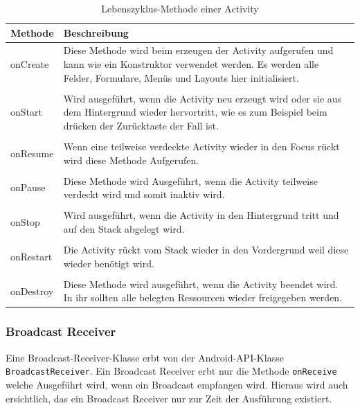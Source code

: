 \begin{table}[!ht]
\begin{tabular}{|p{3cm}|p{12cm}|}
 \hline Methode & Beschreibung \\
 \hline onCreate & Diese Methode wird beim erzeugen der Activity aufgerufen und kann wie ein Konstruktor verwendet werden. Es werden alle Felder, Formulare, Men\"us und Layouts hier initialisiert.\\&\\
 onStart & Wird ausgef\"uhrt, wenn die Activity neu erzeugt wird oder sie aus dem Hintergrund wieder hervortritt, wie es zum Beispiel beim dr\"ucken der Zur\"ucktaste der Fall ist.\\&\\
 onResume & Wenn eine teilweise verdeckte Activity wieder in den Focus r\"uckt wird diese Methode Aufgerufen.\\&\\
 onPause & Diese Methode wird Ausgef\"uhrt, wenn die Activity teilweise verdeckt wird und somit inaktiv wird.\\&\\
 onStop & Wird ausgef\"uhrt, wenn die Activity in den Hintergrund tritt und auf den Stack abgelegt wird.\\&\\
 onRestart & Die Activity r\"uckt vom Stack wieder in den Vordergrund weil diese wieder ben\"otigt wird.\\&\\
 onDestroy & Diese Methode wird ausgef\"uhrt, wenn die Activity beendet wird. In ihr sollten alle belegten Ressourcen wieder freigegeben werden.\\
 \hline
\end{tabular}
\caption{Lebenszyklus-Methode einer Activity \cite{Android44}}
\label{Lebenszyklus-Methode einer Activity}
\end{table}
\FloatBarrier

\subsubsection{Broadcast Receiver} \label{Broadcast Receiver aus Programmierersicht}
Eine Broadcast-Receiver-Klasse erbt von der Android-API-Klasse \texttt{BroadcastReceiver}. Ein Broadcast Receiver erbt nur die Methode \texttt{onReceive} welche Ausgef\"uhrt wird, wenn ein Broadcast empfangen wird. Hieraus wird auch ersichtlich, das ein Broadcast Receiver nur zur Zeit der Ausf\"uhrung existiert.

